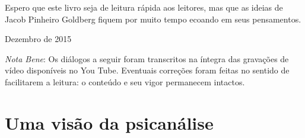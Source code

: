 Espero que este livro seja de leitura rápida aos leitores, mas que as
ideias de Jacob Pinheiro Goldberg fiquem por muito tempo ecoando em seus
pensamentos.

\smallskip{} 

\hfill {}Dezembro de 2015

\bigskip{} 

\emph{Nota Bene}: Os diálogos a seguir foram transcritos na íntegra das
gravações de vídeo disponíveis no You Tube. Eventuais correções foram
feitas no sentido de facilitarem a leitura: o conteúdo e seu vigor
permanecem intactos.

\part{Uma visão da psicanálise} 
